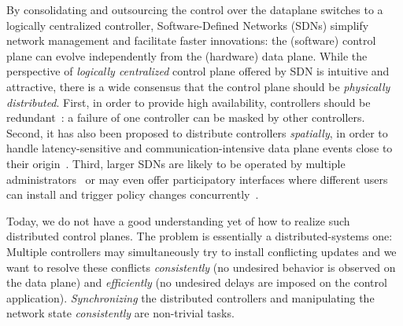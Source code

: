 \documentclass[conference]{sigcomm-alternate}
\begin{document}
By consolidating and outsourcing the control over the dataplane switches to a logically
centralized controller, Software-Defined Networks (SDNs)
simplify network management and facilitate faster innovations:
the (software) control plane can evolve independently from the
(hardware) data plane.
%
While the perspective of \emph{logically centralized} control plane
offered by SDN is intuitive and attractive,
there is a wide consensus that
the control plane should be  \emph{physically distributed}.
First, in order to provide high availability,
controllers should be redundant~\cite{onix,onos,elasticon}: a failure 
of one controller can be masked by other controllers.
Second, it has also been proposed to distribute controllers \emph{spatially}, in order to handle latency-sensitive and
communication-intensive
data plane
events close to their origin~\cite{devoflow,kandoo}.
Third, larger SDNs are likely to be operated by multiple administrators~\cite{stn} or may even offer
participatory interfaces where different users can install and trigger policy changes
concurrently~\cite{participatory}.


Today, we do not have a good understanding yet of how to realize
such distributed control planes. The problem is essentially a
distributed-systems
one: Multiple controllers may simultaneously try to
install conflicting updates and we want to resolve these conflicts
\emph{consistently} (no undesired behavior is observed on the data
plane) and \emph{efficiently} (no undesired delays are imposed on the
control application).
\emph{Synchronizing}
the distributed controllers and manipulating the network state \emph{consistently}
are non-trivial tasks.~\cite{sharon}
\end{document}
